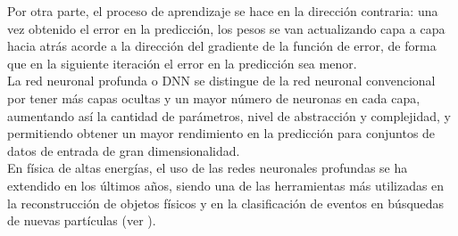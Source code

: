 Por otra parte, el proceso de aprendizaje se hace en la direcci\'on contraria: una vez obtenido el error en la predicci\'on, los pesos se van actualizando capa a capa hacia atr\'as acorde a la direcci\'on del gradiente de la funci\'on de error, de forma que en la siguiente iteraci\'on el error en la predicci\'on sea menor. \\

La red neuronal profunda o DNN se distingue de la red neuronal convencional por tener m\'as capas ocultas y un mayor n\'umero de neuronas en cada capa, aumentando as\'i la cantidad de par\'ametros, nivel de abstracci\'on y complejidad, y permitiendo obtener un mayor rendimiento en la predicci\'on para conjuntos de datos de entrada de gran dimensionalidad. \\

En f\'isica de altas energ\'ias, el uso de las redes neuronales profundas se ha extendido en los \'ultimos a\~nos, siendo una de las herramientas m\'as utilizadas en la reconstrucci\'on de objetos f\'isicos y en la clasificaci\'on de eventos en b\'usquedas de nuevas part\'iculas (ver \cite{collaboration2020IdentificationOH}). 
